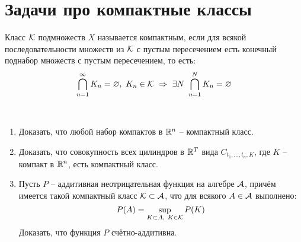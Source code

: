 \section{Задачи про компактные классы}

\begin{definition}
    Класс $\mathcal{K}$ подмножеств $X$ называется компактным, если для всякой последовательности множеств из $\mathcal{K}$ с пустым пересечением есть конечный поднабор множеств с пустым пересечением, то есть:
    \[
        \bigcap_{n=1}^\infty K_n = \varnothing,\ K_n \in \mathcal{K} \ \Rightarrow \ \exists N \ \bigcap_{n=1}^N K_n = \varnothing
    \]
\end{definition}

\begin{problem}~
    \begin{enumerate}
        \item Доказать, что любой набор компактов в $\mathbb{R}^n$ -- компактный класс.

        \item Доказать, что совокупность всех цилиндров в $\mathbb{R}^T$ вида $C_{t_1, \dots, t_n, K}$, где $K$ -- компакт в $\mathbb{R}^n$, есть компактный класс.

        \item Пусть $P$ -- аддитивная неотрицательная функция на алгебре $\mathcal{A}$, причём имеется такой компактный класс $\mathcal{K} \subset \mathcal{A}$, что для всякого $A \in \mathcal{A}$ выполнено:
        \[
            P(A) = \sup_{K \subset A,\ K \in \mathcal{K}} P(K)
        \]
        Доказать, что функция $P$ счётно-аддитивна.
    \end{enumerate}
\end{problem}

